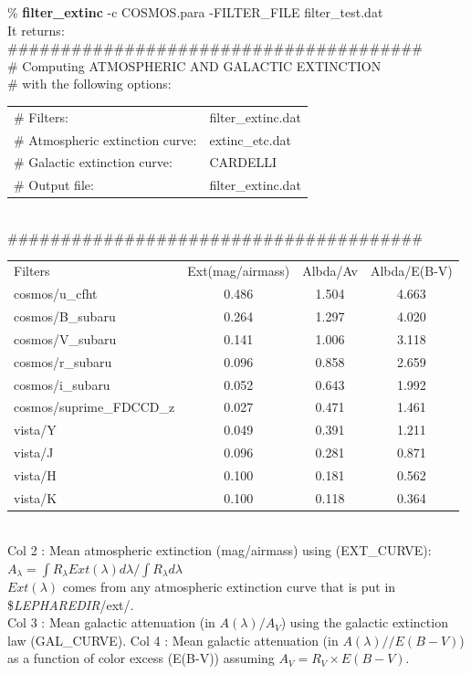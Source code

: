 \documentclass[12pt]{article}
\begin{document}
%

\% {\bf filter\_extinc}  -c COSMOS.para   -FILTER\_FILE filter\_test.dat\\
 It returns: \\ 
\#\#\#\#\#\#\#\#\#\#\#\#\#\#\#\#\#\#\#\#\#\#\#\#\#\#\#\#\#\#\#\#\#\#\#\#\#\#\#\\
\# Computing ATMOSPHERIC AND GALACTIC EXTINCTION \\
\# with the following options: \\
\begin{tabular}{ll}                       
\# Filters: & filter\_extinc.dat\\
\# Atmospheric extinction curve: & extinc\_etc.dat\\
\# Galactic extinction curve: & CARDELLI\\
\# Output file: & filter\_extinc.dat\\
\end{tabular}                 \\
\#\#\#\#\#\#\#\#\#\#\#\#\#\#\#\#\#\#\#\#\#\#\#\#\#\#\#\#\#\#\#\#\#\#\#\#\#\#\#\\

\begin{tabular}{lccc}  
 Filters & Ext(mag/airmass) & Albda/Av & Albda/E(B-V)      \\
         cosmos/u\_cfht   &  0.486  &    1.504  &    4.663  \\
       cosmos/B\_subaru   &  0.264  &    1.297  &    4.020  \\
       cosmos/V\_subaru   &  0.141  &    1.006  &    3.118  \\
       cosmos/r\_subaru   & 0.096   &    0.858  &    2.659  \\
       cosmos/i\_subaru   & 0.052   &    0.643  &    1.992  \\
cosmos/suprime\_FDCCD\_z  & 0.027   &    0.471  &    1.461  \\
                vista/Y   & 0.049   &    0.391  &    1.211  \\
                vista/J   & 0.096   &    0.281  &    0.871  \\
                vista/H   & 0.100   &    0.181  &    0.562  \\
                vista/K   & 0.100   &    0.118  &    0.364  \\
\end{tabular}\\
Col 2 : Mean atmospheric extinction  (mag/airmass) using (EXT\_CURVE): $A_{\lambda}= \int R_{\lambda} Ext(\lambda) d\lambda / \int R_{\lambda} d\lambda $ \\
 $Ext(\lambda)$ comes from any atmospheric extinction curve that is put in \${\it LEPHAREDIR}/ext/.   \\
Col 3 : Mean galactic attenuation (in $A(\lambda)/A_V$) using  the
  galactic extinction law (GAL\_CURVE). 
Col 4 : Mean galactic attenuation (in $A(\lambda)//E(B-V)$)  as a function
 of color excess (E(B-V)) assuming $A_V=R_V\times E(B-V)$.  \\
\end{document}
